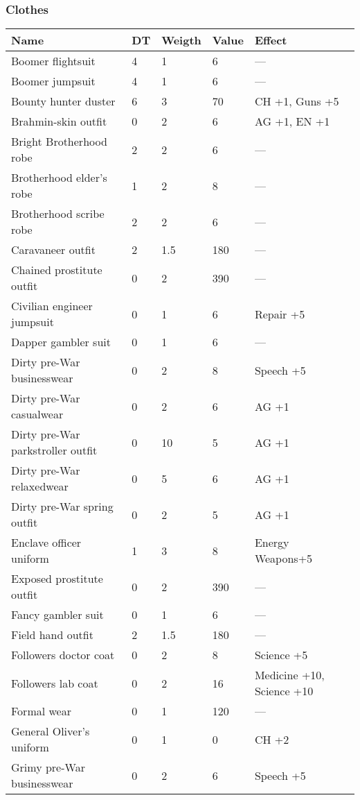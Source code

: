 
\subsubsection{Clothes}
\begin{longtable}{|p{6cm}|p{0.9cm}|p{1.2cm}|p{1.2cm}|p{6cm}|}
\hline
\bfseries Name & \bfseries DT & \bfseries Weigth & \bfseries Value & \bfseries Effect \\
\hline
\endhead
Boomer flightsuit & 4 & 1 & 6 & — \\
Boomer jumpsuit & 4 & 1 & 6 & — \\
Bounty hunter duster & 6 & 3 & 70 & CH +1, Guns +5 \\
Brahmin-skin outfit & 0 & 2 & 6 & AG +1, EN +1 \\
Bright Brotherhood robe & 2 & 2 & 6 & — \\
Brotherhood elder's robe & 1 & 2 & 8 & — \\
Brotherhood scribe robe & 2 & 2 & 6 & — \\
Caravaneer outfit & 2 & 1.5 & 180 & — \\
Chained prostitute outfit & 0 & 2 & 390 & — \\
Civilian engineer jumpsuit & 0 & 1 & 6 & Repair +5 \\
Dapper gambler suit & 0 & 1 & 6 & — \\
Dirty pre-War businesswear & 0 & 2 & 8 & Speech +5 \\
Dirty pre-War casualwear & 0 & 2 & 6 & AG +1 \\
Dirty pre-War parkstroller outfit & 0 & 10 & 5 & AG +1 \\
Dirty pre-War relaxedwear & 0 & 5 & 6 & AG +1 \\
Dirty pre-War spring outfit & 0 & 2 & 5 & AG +1 \\
Enclave officer uniform & 1 & 3 & 8 & Energy Weapons+5 \\
Exposed prostitute outfit & 0 & 2 & 390 & — \\
Fancy gambler suit & 0 & 1 & 6 & — \\
Field hand outfit & 2 & 1.5 & 180 & — \\
Followers doctor coat & 0 & 2 & 8 & Science +5 \\
Followers lab coat & 0 & 2 & 16 & Medicine +10, Science +10 \\
Formal wear & 0 & 1 & 120 & — \\
General Oliver's uniform & 0 & 1 & 0 & CH +2 \\
Grimy pre-War businesswear & 0 & 2 & 6 & Speech +5 \\

\end{longtable}
